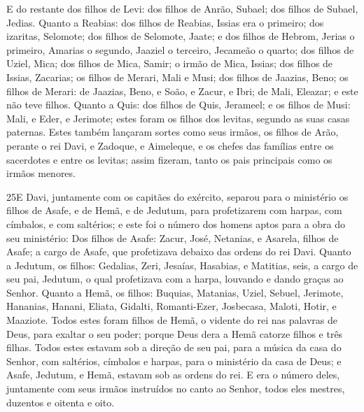 E do restante dos filhos de Levi: dos filhos de Anrão, Subael;
dos filhos de Subael, Jedias. Quanto a Reabias: dos filhos de
Reabias, Issias era o primeiro; dos izaritas, Selomote; dos
filhos de Selomote, Jaate; e dos filhos de Hebrom, Jerias o
primeiro, Amarias o segundo, Jaaziel o terceiro, Jecameão o quarto;
dos filhos de Uziel, Mica; dos filhos de Mica, Samir;
o irmão de Mica, Issias; dos filhos de Issias, Zacarias;
os filhos de Merari, Mali e Musi; dos filhos de Jaazias,
Beno; os filhos de Merari: de Jaazias, Beno, e Soão, e Zacur,
e Ibri; de Mali, Eleazar; e este não teve filhos.
Quanto a Quis: dos filhos de Quis, Jerameel; e os
filhos de Musi: Mali, e Eder, e Jerimote; estes foram os filhos dos
levitas, segundo as suas casas paternas. Estes também
lançaram sortes como seus irmãos, os filhos de Arão, perante o rei
Davi, e Zadoque, e Aimeleque, e os chefes das famílias entre os
sacerdotes e entre os levitas; assim fizeram, tanto os pais
principais como os irmãos menores.

\medskip

\lettrine{25} E Davi, juntamente com os capitães do exército,
separou para o ministério os filhos de Asafe, e de Hemã, e de
Jedutum, para profetizarem com harpas, com címbalos, e com
saltérios; e este foi o número dos homens aptos para a obra do seu
ministério: Dos filhos de Asafe: Zacur, José, Netanias, e
Asarela, filhos de Asafe; a cargo de Asafe, que profetizava debaixo
das ordens do rei Davi. Quanto a Jedutum, os filhos: Gedalias,
Zeri, Jesaías, Hasabias, e Matitias, seis, a cargo de seu pai,
Jedutum, o qual profetizava com a harpa, louvando e dando graças ao
Senhor. Quanto a Hemã, os filhos: Buquias, Matanias, Uziel,
Sebuel, Jerimote, Hananias, Hanani, Eliata, Gidalti, Romanti-Ezer,
Josbecasa, Maloti, Hotir, e Maaziote. Todos estes foram filhos
de Hemã, o vidente do rei nas palavras de Deus, para exaltar o seu
poder; porque Deus dera a Hemã catorze filhos e três filhas.
Todos estes estavam sob a direção de seu pai, para a música da
casa do Senhor, com saltérios, címbalos e harpas, para o ministério
da casa de Deus; e Asafe, Jedutum, e Hemã, estavam sob as ordens do
rei. E era o número deles, juntamente com seus irmãos instruídos
no canto ao Senhor, todos eles mestres, duzentos e oitenta e oito.

